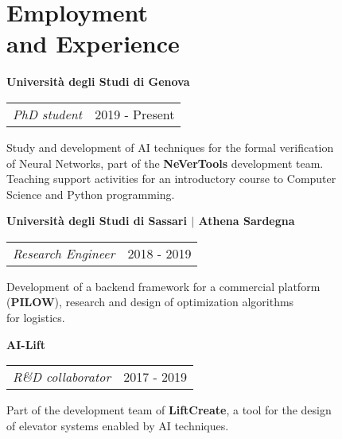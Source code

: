 \section{\sc Employment \\and Experience}
{\bf{Universit\`a degli Studi di Genova}}\\
\begin{tabular}{@{}p{4in}p{2in}}
	\textit{PhD student} & 2019 - Present\\
\end{tabular}

\begin{list1}
	\item[] Study and development of AI techniques for the formal verification\\
	of Neural Networks, part of the \textbf{NeVerTools} development team.\\
	Teaching support activities for an introductory course to Computer\\
	Science and Python programming.
\end{list1}


{\bf{Universit\`a degli Studi di Sassari $\vert$ Athena Sardegna}}\\
\begin{tabular}{@{}p{4in}p{2in}}
	\textit{Research Engineer} & 2018 - 2019\\
\end{tabular}

\begin{list1}
	\item[] Development of a backend framework for a commercial platform\\
	(\textbf{PILOW}), research and design of optimization algorithms\\
	for logistics.
\end{list1}


{\bf{AI-Lift}}\\
\begin{tabular}{@{}p{4in}p{2in}}
	\textit{R\&D collaborator}  & 2017 - 2019\\
\end{tabular}

\begin{list1}
	\item[] Part of the development team of \textbf{LiftCreate}, a tool for the design\\
	of elevator systems enabled by AI techniques.
\end{list1}
